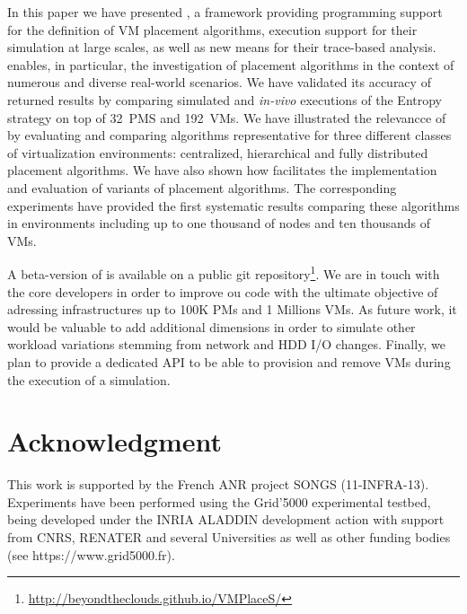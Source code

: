 In this paper we have presented \vmps, a framework providing
programming support for the definition of VM placement algorithms,
execution support for their simulation at large scales, as well as new
means for their trace-based analysis. \vmps enables, in particular,
the investigation of placement algorithms in the context of numerous
and diverse real-world scenarios. We have validated its accuracy of
returned results by comparing simulated and \textit{in-vivo}
executions of the Entropy strategy on top of 32~PMS and 192~VMs. We
have illustrated the relevancce of \vmps by evaluating and comparing
algorithms representative for three different classes of
virtualization environments: centralized, hierarchical and fully
distributed placement algorithms. We have also shown how \vmps
facilitates the implementation and evaluation of variants of placement
algorithms. The corresponding experiments have provided the first
systematic results comparing these algorithms in environments
including up to one thousand of nodes and ten thousands of VMs.

A beta-version of \vmps is available on a public git
repository\footnote{\url{http://beyondtheclouds.github.io/VMPlaceS/}}.
We are in touch with the \sg core developers in order to improve ou
code with the ultimate objective of adressing infrastructures up to
100K PMs and 1 Millions VMs. As future work, it would be valuable to add
additional dimensions in order to simulate other workload variations
stemming from network and HDD I/O changes. Finally,
we plan to provide a dedicated API to be able to
provision and remove VMs during the execution of a simulation.

\section{Acknowledgment}

This work is supported by the French ANR project SONGS (11-INFRA-13).
Experiments have been performed using the Grid'5000 experimental
testbed, being developed under the INRIA ALADDIN development action
with support from CNRS, RENATER and several Universities as well as
other funding bodies (see https://www.grid5000.fr).


